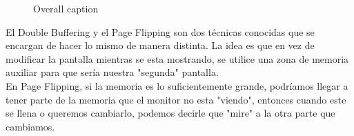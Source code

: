 \documentclass[]{article}
\begin{document}
\begin{figure}
	\centering
	\caption{\label{ref_label_overall}Overall caption}
\end{figure}


El Double Buffering y el Page Flipping son dos t\'ecnicas conocidas que se encargan de hacer lo mismo de manera distinta. La idea es que en vez de modificar la pantalla mientras se esta mostrando, se utilice una zona de memoria auxiliar para que ser\'ia nuestra "segunda" pantalla.\\

En Page Flipping, si la memoria es lo suficientemente grande, podr\'iamos llegar a tener parte de la memoria que el monitor no esta "viendo", entonces cuando este se llena o queremos cambiarlo, podemos decirle que "mire" a la otra parte que cambiamos.\\
\end{document}
